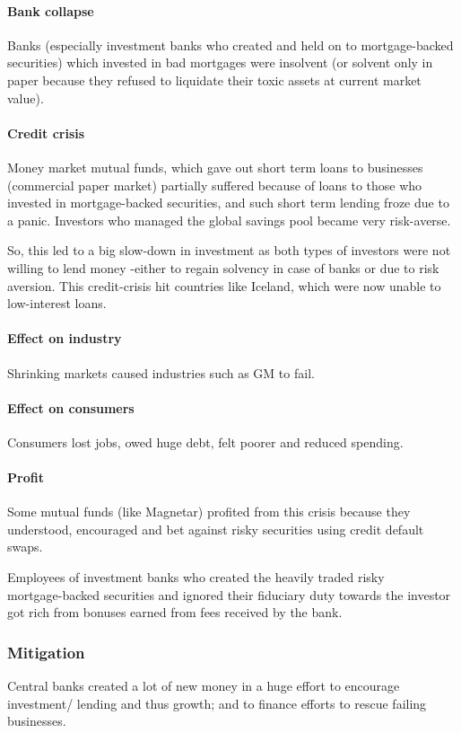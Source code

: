 \documentclass[oneside, article]{memoir}
\begin{document}
\paragraph{Bank collapse}
Banks (especially investment banks who created and held on to mortgage-backed securities) which invested in bad mortgages were insolvent (or solvent only in paper because they refused to liquidate their toxic assets at current market value).

\paragraph{Credit crisis}
Money market mutual funds, which gave out short term loans to businesses (commercial paper market) partially suffered because of loans to those who invested in mortgage-backed securities, and such short term lending froze due to a panic. Investors who managed the global savings pool became very risk-averse.

So, this led to a big slow-down in investment as both types of investors were not willing to lend money -either to regain solvency in case of banks or due to risk aversion. This credit-crisis hit countries like Iceland, which were now unable to low-interest loans.

\paragraph{Effect on industry}
Shrinking markets caused industries such as GM to fail.

\paragraph{Effect on consumers}
Consumers lost jobs, owed huge debt, felt poorer and reduced spending.

\paragraph{Profit}
Some mutual funds (like Magnetar) profited from this crisis because they understood, encouraged and bet against risky securities using credit default swaps.

Employees of investment banks who created the heavily traded risky \\mortgage-backed securities and ignored their fiduciary duty towards the investor got rich from bonuses earned from fees received by the bank.

\subsubsection{Mitigation}
Central banks created a lot of new money in a huge effort to encourage investment/ lending and thus growth; and to finance efforts to rescue failing businesses.
\end{document}
